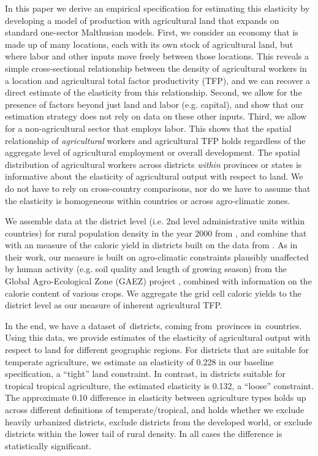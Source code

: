\documentclass[11pt]{article}
\begin{document}
In this paper we derive an empirical specification for estimating this elasticity by developing a model of production with agricultural land that expands on standard one-sector Malthusian models. First, we consider an economy that is made up of many locations, each with its own stock of agricultural land, but where labor and other inputs move freely between those locations. This reveals a simple cross-sectional relationship between the density of agricultural workers in a location and agricultural total factor productivity (TFP), and we can recover a direct estimate of the elasticity from this relationship. Second, we allow for the presence of factors beyond just land and labor (e.g. capital), and show that our estimation strategy does not rely on data on these other inputs. Third, we allow for a non-agricultural sector that employs labor. This shows that the spatial relationship of \textit{agricultural} workers and agricultural TFP holds regardless of the aggregate level of agricultural employment or overall development. The spatial distribution of agricultural workers across districts \textit{within} provinces or states is informative about the elasticity of agricultural output with respect to land. We do not have to rely on cross-country comparisons, nor do we have to assume that the elasticity is homogeneous within countries or across agro-climatic zones.

We assemble data at the district level (i.e. 2nd level administrative units within countries) for rural population density in the year 2000 from \citet{hyde31}, and combine that with an measure of the caloric yield in districts built on the data from \citet{galorozak2016}. As in their work, our measure is built on agro-climatic constraints plausibly unaffected by human activity (e.g. soil quality and length of growing season) from the Global Agro-Ecological Zone (GAEZ) project \citep{gaez}, combined with information on the calorie content of various crops. We aggregate the grid cell caloric yields to the district level as our measure of inherent agricultural TFP.

In the end, we have a dataset of\districts \ districts, coming from\provinces \ provinces in\countries \ countries. Using this data, we provide estimates of the elasticity of agricultural output with respect to land for different geographic regions. For districts that are suitable for temperate agriculture, we estimate an elasticity of 0.228 in our baseline specification, a ``tight'' land constraint. In contrast, in districts suitable for tropical tropical agriculture, the estimated elasticity is 0.132, a ``loose'' constraint. The approximate 0.10 difference in elasticity between agriculture types holds up across different definitions of temperate/tropical, and holds whether we exclude heavily urbanized districts, exclude districts from the developed world, or exclude districts within the lower tail of rural density. In all cases the difference is statistically significant.
\end{document}
